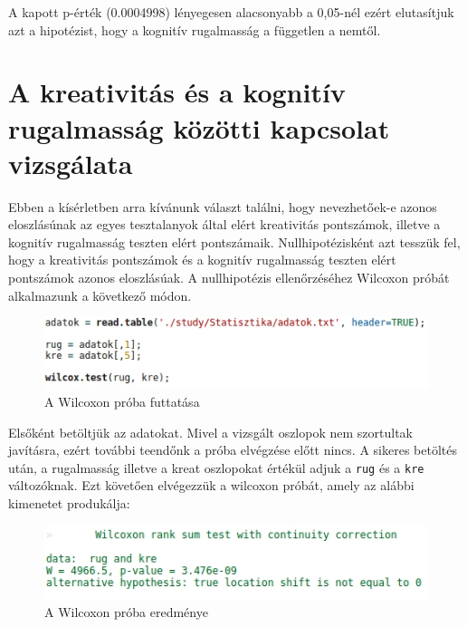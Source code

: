 \documentclass[oneside,titlepage,12pt,a4paper]{report}
\begin{document}
A kapott p-érték (0.0004998) lényegesen alacsonyabb a 0,05-nél ezért elutasítjuk azt a hipotézist, hogy a kognitív rugalmasság a független a nemtől.  


\section*{A kreativitás és a kognitív rugalmasság közötti kapcsolat vizsgálata}

Ebben a kísérletben arra kívánunk választ találni, hogy nevezhetőek-e azonos eloszlásúnak az egyes tesztalanyok által elért kreativitás pontszámok, illetve a kognitív rugalmasság teszten elért pontszámaik. Nullhipotézisként azt tesszük fel, hogy a kreativitás pontszámok és a kognitív rugalmasság teszten elért pontszámok azonos eloszlásúak. A nullhipotézis ellenőrzéséhez Wilcoxon próbát alkalmazunk a következő módon. 


\begin{figure}[H]
\begin{center}
  \includegraphics[width=150mm]{./Abrak/wilcoxCommand.jpg}
  \caption{A Wilcoxon próba futtatása}
\end{center}
\end{figure}

Elsőként betöltjük az adatokat. Mivel a vizsgált oszlopok nem szortultak javításra, ezért további teendőnk a próba elvégzése előtt nincs. A sikeres betöltés után, a rugalmasság illetve a kreat oszlopokat értékül adjuk a \texttt{rug} és a \texttt{kre} változóknak. Ezt követően elvégezzük a wilcoxon próbát, amely az alábbi kimenetet produkálja:

\begin{figure}[H]
\begin{center}
  \includegraphics[width=150mm]{./Abrak/wilcoxOutput.jpg}
  \caption{A Wilcoxon próba eredménye}
\end{center}
\end{figure}
\end{document}
